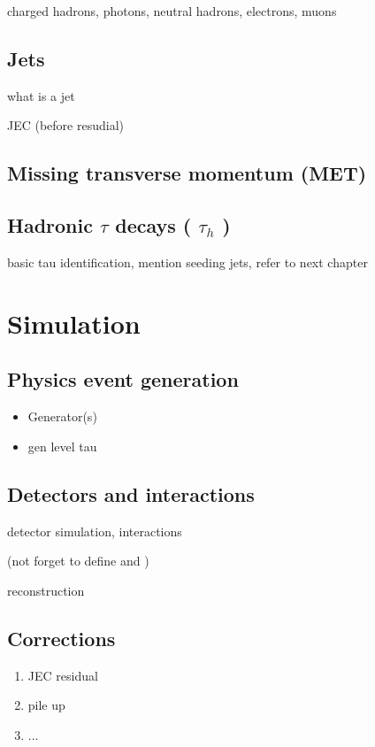 charged hadrons, photons, neutral hadrons, electrons, muons

\subsection{Jets}

\label{sec:jet_clustering}

what is a jet

JEC (before resudial)

\subsection{Missing transverse momentum (MET)}

\subsection{Hadronic $\tau$ decays ( $\tau_{h}$ )}

basic tau identification, mention seeding jets, refer to next chapter

\section{Simulation}

\subsection{Physics event generation} 
\label{sec:cms_physics_event_generation}

\begin{itemize}
\item Generator(s)
\item gen level tau
\end{itemize}

\subsection{Detectors and interactions}
\label{sec:cms_physics_event_reconstruction}

detector simulation, interactions

(not forget to define \Deltar and \Deltaz)

reconstruction

\subsection{Corrections}

\begin{enumerate}
\item JEC residual
\item pile up
\item ...
\end{enumerate}